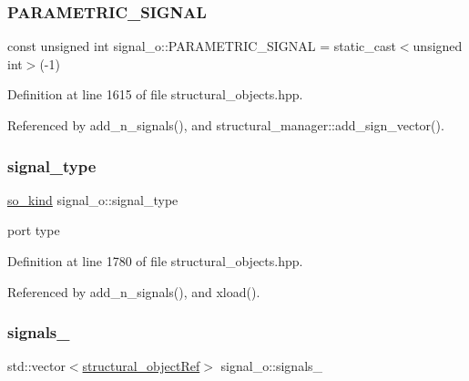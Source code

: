 \subsubsection{\texorpdfstring{P\+A\+R\+A\+M\+E\+T\+R\+I\+C\+\_\+\+S\+I\+G\+N\+AL}{PARAMETRIC\_SIGNAL}}
{\footnotesize\ttfamily const unsigned int signal\+\_\+o\+::\+P\+A\+R\+A\+M\+E\+T\+R\+I\+C\+\_\+\+S\+I\+G\+N\+AL = static\+\_\+cast$<$unsigned int$>$(-\/1)\hspace{0.3cm}{\ttfamily [static]}}



Definition at line 1615 of file structural\+\_\+objects.\+hpp.



Referenced by add\+\_\+n\+\_\+signals(), and structural\+\_\+manager\+::add\+\_\+sign\+\_\+vector().

\mbox{\label{classsignal__o_ad09abb984f514b0927d63389c72c86f6}} 
\subsubsection{\texorpdfstring{signal\+\_\+type}{signal\_type}}
{\footnotesize\ttfamily \hyperlink{structural__objects_8hpp_acf52399aecacb7952e414c5746ce6439}{so\+\_\+kind} signal\+\_\+o\+::signal\+\_\+type\hspace{0.3cm}{\ttfamily [private]}}



port type 



Definition at line 1780 of file structural\+\_\+objects.\+hpp.



Referenced by add\+\_\+n\+\_\+signals(), and xload().

\mbox{\label{classsignal__o_ab1fba733f5b6851a70b1f63f6edf3a83}} 
\subsubsection{\texorpdfstring{signals\+\_\+}{signals\_}}
{\footnotesize\ttfamily std\+::vector$<$\hyperlink{structural__objects_8hpp_a8ea5f8cc50ab8f4c31e2751074ff60b2}{structural\+\_\+object\+Ref}$>$ signal\+\_\+o\+::signals\+\_\+\hspace{0.3cm}{\ttfamily [private]}}



